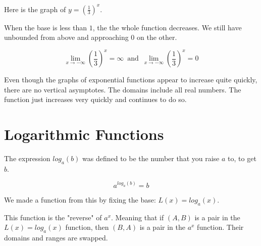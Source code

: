\documentclass{ximera}
\begin{document}
Here is the graph of $y = \left(\frac{1}{3}\right)^x$.

\begin{image}
\end{image}


When the base is less than $1$, the the whole function decreases.  We still have unbounded from above and approaching $0$ on the other.

\[  \lim_{x \to -\infty} \left(\frac{1}{3}\right)^x = \infty     \, \text{ and } \,  \lim_{x \to -\infty} \left(\frac{1}{3}\right)^x = 0   \]




Even though the graphs of exponential functions appear to increase quite quickly, there are no vertical asymptotes.  The domains include all real numbers.  The function just increases very quickly and continues to do so.











\section{Logarithmic Functions}

The expression $log_a(b)$ was defined to be the number that you raise $a$ to, to get $b$.

\[   a^{log_a(b)} = b  \]




We made a function from this by fixing the base:  $L(x) = log_a(x)$.


This function is the "reverse" of $a^x$.  Meaning that if $(A, B)$ is a pair in the $L(x) = log_a(x)$ function, then $(B, A)$ is a pair in the $a^x$ function. Their domains and ranges are swapped.
\end{document}
